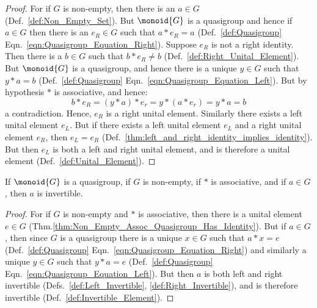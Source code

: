         \begin{proof}
            For if $G$ is non-empty, then there is an $a\in{G}$
            (Def.~\ref{def:Non_Empty_Set}). But $\monoid{G}$ is a quasigroup and
            hence if $a\in{G}$ then there is an $e_{R}\in{G}$ such that
            $a*e_{R}=a$ (Def.~\ref{def:Quasigroup}
            Eqn.~\ref{eqn:Quasigroup_Equation_Right}). Suppose $e_{R}$ is not a
            right identity. Then there is a $b\in{G}$ such that
            $b*e_{R}\ne{b}$ (Def.~\ref{def:Right_Unital_Element}). But
            $\monoid{G}$ is a quasigroup, and hence there is a unique $y\in{G}$
            such that $y*a=b$ (Def.~\ref{def:Quasigroup}
            Eqn.~\ref{eqn:Quasigroup_Equation_Left}). But by hypothesis $*$ is
            associative, and hence:
            \begin{equation}
                b*e_{R}=(y*a)*e_{r}=y*(a*e_{r})=y*a=b
            \end{equation}
            a contradiction. Hence, $e_{R}$ is a right unital element. Similarly
            there exists a left unital element $e_{L}$. But if there exists a
            left unital element $e_{L}$ and a right unital element $e_{R}$, then
            $e_{L}=e_{R}$
            (Def.~\ref{thm:left_and_right_identity_implies_identity}). But then
            $e_{L}$ is both a left and right unital element, and is therefore
            a unital element (Def.~\ref{def:Unital_Element}).
        \end{proof}
        \begin{theorem}
            \label{thm:Non_Empty_Assoc_Quasigroup_has_Invs}%
            If $\monoid{G}$ is a quasigroup, if $G$ is non-empty, if $*$ is
            associative, and if $a\in{G}$, then $a$ is invertible.
        \end{theorem}
        \begin{proof}
            For if $G$ is non-empty and $*$ is associative, then there is a
            unital element $e\in{G}$
            (Thm.\ref{thm:Non_Empty_Assoc_Quasigroup_Has_Identity}). But if
            $a\in{G}$, then since $G$ is a quasigroup there is a unique
            $x\in{G}$ such that $a*x=e$ (Def.~\ref{def:Quasigroup}
            Eqn.~\ref{eqn:Quasigroup_Equation_Right}) and similarly a unique
            $y\in{G}$ such that $y*a=e$ (Def.~\ref{def:Quasigroup}
            Eqn.~\ref{eqn:Quasigroup_Equation_Left}). But then $a$ is both left
            and right invertible (Defs.~\ref{def:Left_Invertible},
            \ref{def:Right_Invertible}), and is therefore invertible
            (Def.~\ref{def:Invertible_Element}).
        \end{proof}
